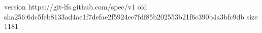 version https://git-lfs.github.com/spec/v1
oid sha256:6dc5feb8133ad4ae1f7defae2f5924ee7fdf85b202553b21f6c390b4a3bfc9db
size 1181
